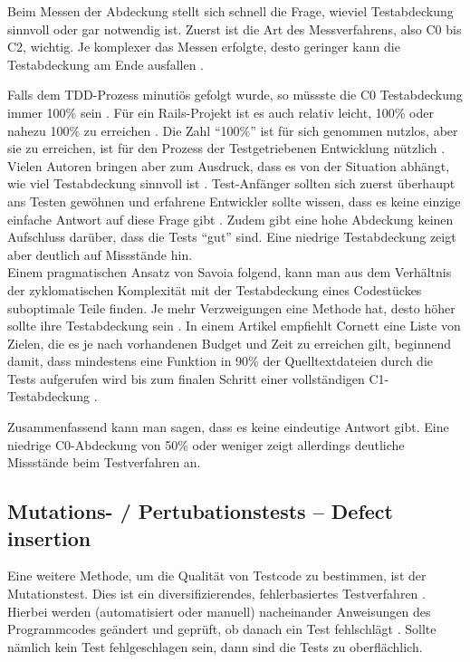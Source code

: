  Beim Messen der Abdeckung stellt sich schnell die Frage, wieviel Testabdeckung sinnvoll oder gar notwendig ist. Zuerst ist die Art des Messverfahrens, also C0 bis C2, wichtig. Je komplexer das Messen erfolgte, desto geringer kann die Testabdeckung am Ende ausfallen \citep{catherine_powell_abakas_2008}.

 Falls dem TDD-Prozess minutiös gefolgt wurde, so müssste die C0 Testabdeckung immer 100\% sein \citep{beck_test_2002}. Für ein Rails-Projekt ist es auch relativ leicht, 100\% oder nahezu 100\% zu erreichen \citep{rappin_rails_2011}. Die Zahl "`100\%"' ist für sich genommen nutzlos, aber sie zu erreichen, ist für den Prozess der Testgetriebenen Entwicklung nützlich \citep[S. 270]{rappin_rails_2011}. Vielen Autoren bringen aber zum Ausdruck, dass es von der Situation abhängt, wie viel Testabdeckung sinnvoll ist \citep{infoq_2007}. Test-Anfänger sollten sich zuerst überhaupt ans Testen gewöhnen und erfahrene Entwickler sollte wissen, dass es keine einzige einfache Antwort auf diese Frage gibt \citep{infoq_2007}. Zudem gibt eine hohe Abdeckung keinen Aufschluss darüber, dass die Tests "`gut"' sind. Eine niedrige Testabdeckung zeigt aber deutlich auf Missstände hin.\\
 Einem pragmatischen Ansatz von Savoia folgend, kann man aus dem Verhältnis der zyklomatischen Komplexität mit der Testabdeckung eines Codestückes suboptimale Teile finden. Je mehr Verzweigungen eine Methode hat, desto höher sollte ihre Testabdeckung sein \citep{alberto_savoia_code_2007}. In einem Artikel empfiehlt Cornett eine Liste von Zielen, die es je nach vorhandenen Budget und Zeit zu erreichen gilt, beginnend damit, dass mindestens eine Funktion in 90\% der Quelltextdateien durch die Tests aufgerufen wird bis zum finalen Schritt einer vollständigen C1-Testabdeckung \citep{steve_cornett_code_1996}.

 Zusammenfassend kann man sagen, dass es keine eindeutige Antwort gibt. Eine niedrige C0-Abdeckung von 50\% oder weniger zeigt allerdings deutliche Missstände beim Testverfahren an.

 \subsection{Mutations- / Pertubationstests -- Defect insertion}
 \label{sec:mutation}
 Eine weitere Methode, um die Qualität von Testcode zu bestimmen, ist der Mutationstest. Dies ist ein diversifizierendes, fehlerbasiertes Testverfahren \citep{liggesmeyer_modultest_1990}. Hierbei werden (automatisiert oder manuell) nacheinander Anweisungen des Programmcodes geändert und geprüft, ob danach ein Test fehlschlägt \citep{beck_test_2002}. Sollte nämlich kein Test fehlgeschlagen sein, dann sind die Tests zu oberflächlich.

